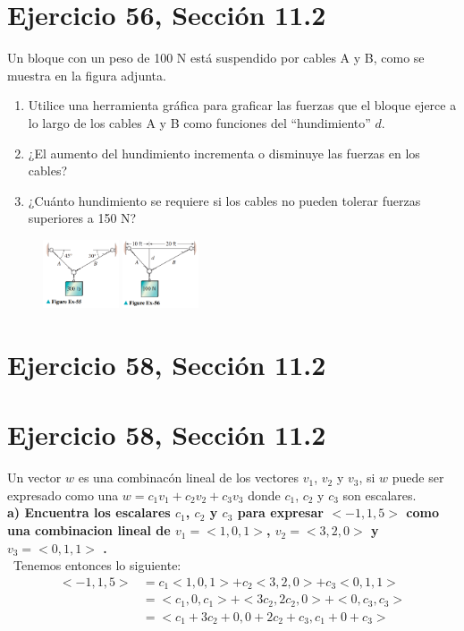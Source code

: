\documentclass[11pt,letterpaper]{article}
\begin{document}
\section{Ejercicio 56, Sección 11.2}
Un bloque con un peso de 100 N está suspendido por cables A y B, como se muestra en la figura adjunta.
\begin{enumerate}
    \item Utilice una herramienta gráfica para graficar las fuerzas que el bloque ejerce a lo largo de los cables A y B como funciones del ``hundimiento'' $d$.
    \item ¿El aumento del hundimiento incrementa o disminuye las fuerzas en los cables?
    \item ¿Cuánto hundimiento se requiere si los cables no pueden tolerar fuerzas superiores a 150 N?
\end{enumerate}

\begin{figure}[h]
    \centering
    \includegraphics[width=0.2\textwidth]{imagenes/Figure_Ex-55.png}
    \hspace{5cm}
    \includegraphics[width=0.2\textwidth]{imagenes/Figure_Ex-56.png}
\end{figure}


\section{Ejercicio 58, Sección 11.2}
\section{Ejercicio 58, Sección 11.2}
Un vector $w$ es una combinacón lineal de los vectores $v_1$, $v_2$ y $v_3$, si $w$ puede ser expresado como una $w=c_1v_1+c_2v_2+c_3v_3$ donde $c_1$, $c_2$ y $c_3$  son escalares.\\
\textbf{a) Encuentra los escalares $c_1$, $c_2$ y $c_3$ para expresar $<-1,1,5>$ como una combinacion lineal de $v_1=<1,0,1>$, $v_2=<3,2,0>$ y $v_3=<0,1,1>$ .}\\\
Tenemos entonces lo siguiente:
\begin{equation*}
    \begin{split}
        <-1,1,5> &= c_1<1,0,1> + c_2<3,2,0> + c_3<0,1,1>\\
        &=<c_1,0,c_1> + <3c_2,2c_2,0> + <0,c_3,c_3>\\
        &=<c_1+3c_2+0,0+2c_2+c_3,c_1+0+c_3>
    \end{split}
\end{equation*}
\end{document}
